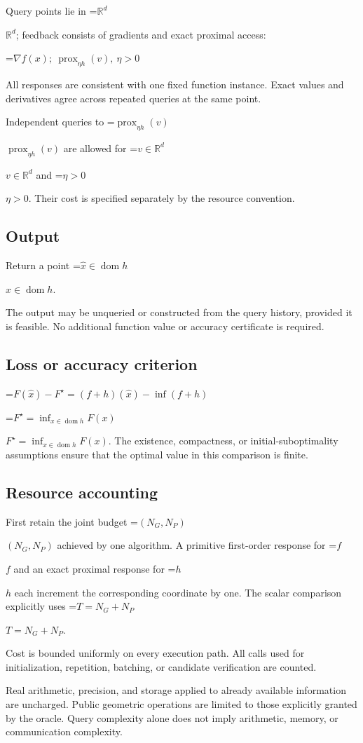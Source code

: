 \documentclass[10pt,a4paper]{article}
\newcommand{\AtlasMath}[1]{\par\begingroup\centering\setbox0=\hbox{$\displaystyle #1$}\ifdim\wd0>1.4\linewidth\typeout{ATLAS WIDE FORMULA: \the\wd0}\fi\ifdim\wd0>\linewidth\resizebox{\linewidth}{!}{\box0}\else\box0\fi\par\endgroup}
\newcommand{\AtlasInlineMath}[1]{\begingroup\setbox0=\hbox{$#1$}\ifdim\wd0>.4\linewidth\endgroup\AtlasMath{#1}\else\endgroup$#1$\fi}
\begin{document}
Query points lie in \AtlasInlineMath{\mathbb{R}^d}; feedback consists of gradients and exact proximal access:


\AtlasMath{\nabla f(x);\ \operatorname{prox}_{\eta h}(v),\ \eta>0}


All responses are consistent with one fixed function instance. Exact values and derivatives agree across repeated queries at the same point.

Independent queries to \AtlasInlineMath{\operatorname{prox}_{\eta h}(v)} are allowed for \AtlasInlineMath{v\in\mathbb R^d} and \AtlasInlineMath{\eta>0}. Their cost is specified separately by the resource convention.

\subsection{Output}
Return a point \AtlasInlineMath{\widehat x\in\operatorname{dom}h}.

The output may be unqueried or constructed from the query history, provided it is feasible. No additional function value or accuracy certificate is required.

\subsection{Loss or accuracy criterion}

\AtlasMath{F(\widehat{x})-F^\star=(f+h)(\widehat{x})-\inf(f+h)}


\AtlasInlineMath{F^\star=\inf_{x\in \operatorname{dom}h}F(x)}. The existence, compactness, or initial-suboptimality assumptions ensure that the optimal value in this comparison is finite.

\subsection{Resource accounting}
First retain the joint budget \AtlasInlineMath{(N_G,N_P)} achieved by one algorithm. A primitive first-order response for \AtlasInlineMath{f} and an exact proximal response for \AtlasInlineMath{h} each increment the corresponding coordinate by one. The scalar comparison explicitly uses \AtlasInlineMath{T=N_G+N_P}.

Cost is bounded uniformly on every execution path. All calls used for initialization, repetition, batching, or candidate verification are counted.

Real arithmetic, precision, and storage applied to already available information are uncharged. Public geometric operations are limited to those explicitly granted by the oracle. Query complexity alone does not imply arithmetic, memory, or communication complexity.
\end{document}
